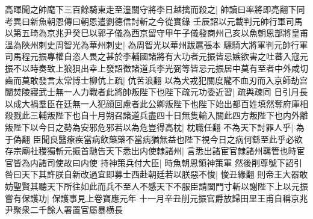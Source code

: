 高暉聞之帥麾下三百餘騎東走至潼關守將李日越擒而殺之|{
	帥讀曰率將即亮翻下同　考異曰新魚朝恩傳曰朝恩遣劉德信討斬之今從實錄}
壬辰詔以元載判元帥行軍司馬以第五琦為京兆尹癸巳以郭子儀為西京留守甲午子儀發商州己亥以魚朝恩部將皇甫溫為陜州刺史周智光為華州刺史|{
	為周智光以華州跋扈張本}
驃騎大將軍判元帥行軍司馬程元振專權自恣人畏之甚於李輔國諸將有大功者元振皆忌嫉欲害之吐蕃入寇元振不以時奏致上狼狽出幸上發詔徵諸道兵李光弼等皆忌元振居中莫有至者中外咸切齒而莫敢發言太常博士柳伉上疏|{
	伉苦浪翻}
以為犬戎犯關度隴不血刃而入京師劫宫闈焚陵寢武士無一人力戰者此將帥叛陛下也陛下疏元功委近習|{
	疏與疎同}
日引月長以成大禍羣臣在廷無一人犯顔回慮者此公卿叛陛下也陛下始出都百姓填然奪府庫相殺戮此三輔叛陛下也自十月朔召諸道兵盡四十日無隻輪入關此四方叛陛下也内外離叛陛下以今日之勢為安邪危邪若以為危豈得高枕|{
	枕職任翻}
不為天下討罪人乎|{
	為于偽翻}
臣聞良醫療疾當病飲藥藥不當病猶無益也陛下視今日之病何繇至此乎必欲存宗廟社稷獨斬元振首馳告天下悉出内使隸諸州|{
	言悉出諸宦官隸諸州羈管也時宦官皆為内諸司使故曰内使}
持神策兵付大臣|{
	時魚朝恩領神策軍}
然後削尊號下詔引咎曰天下其許朕自新改過宜即募士西赴朝廷若以朕惡不悛|{
	悛丑緣翻}
則帝王大器敢妨聖賢其聽天下所往如此而兵不至人不感天下不服臣請闔門寸斬以謝陛下上以元振嘗有保護功|{
	保護事見上卷寶應元年}
十一月辛丑削元振官爵放歸田里王甫自稱京兆尹聚衆二千餘人署置官屬暴横長

